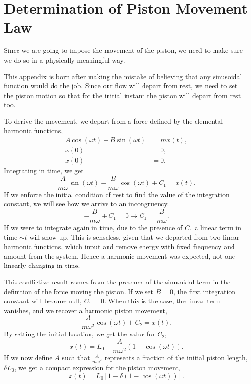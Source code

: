 \documentclass[../../thesis.tex]{subfiles}
\begin{document}
\section{Determination of Piston Movement Law}
\label{sec:appendix_piston_movement_law}
Since we are going to impose the movement of the piston, we need to make sure 
we do so in a physically meaningful way.

This appendix is born after making the mistake of believing that any sinusoidal function would do the job.
Since our flow will depart from rest, 
we need to set the piston motion so that for the initial instant the piston will depart from rest too.

To derive the movement, we depart from a force defined by the elemental harmonic functions,
\begin{subequations}
\begin{align}
        A \cos(\omega t) + B \sin(\omega t) &= m \ddot{x}(t), 
        \\
        x(0) &= 0, 
        \\
        \dot{x}(0) &= 0.
\end{align}
\end{subequations}
Integrating in time, we get
\begin{equation}
    \frac{A}{m \omega} \sin(\omega t) - \frac{B}{m \omega} \cos(\omega t) + C_1 = \dot{x}(t).
\end{equation}
If we enforce the initial condition of rest to find the value of the integration constant, 
we will see how we arrive to an incongruency.
\begin{equation}
    - \frac{B}{m \omega} + C_1 = 0 \rightarrow C_1 = \frac{B}{m \omega}.
\end{equation}
If we were to integrate again in time, 
due to the presence of $C_1$ a linear term in time $\sim t$ will show up.
This is senseless, given that we departed from two linear harmonic functions, 
which input and remove energy with fixed frequency and amount from the system. 
Hence a harmonic movement was expected, not one linearly changing in time.

This conflictive result comes from the presence of the sinusoidal term in the definition of the force moving the piston.
If we set $B=0$, the first integration constant will become null, $C_1=0$. 
When this is the case, the linear term vanishes, and we recover a harmonic piston movement,
\begin{equation}
    \frac{A}{m \omega^2} \cos(\omega t) + C_2 = x(t).
\end{equation}
By setting the initial location, we get the value for $C_2$,
\begin{equation}
    x(t) = L_0 - \frac{A}{m \omega^2} \left(1 - \cos(\omega t)\right).
\end{equation}
If we now define $A$ such that $\frac{A}{m \omega^2}$ represents a fraction of the initial piston length, $\delta L_0$, 
we get a compact expression for the piston movement,
\begin{equation}
    x(t) = L_0\left[1 - \delta \left(1 - \cos(\omega t)\right)\right].
\end{equation}
\end{document}
